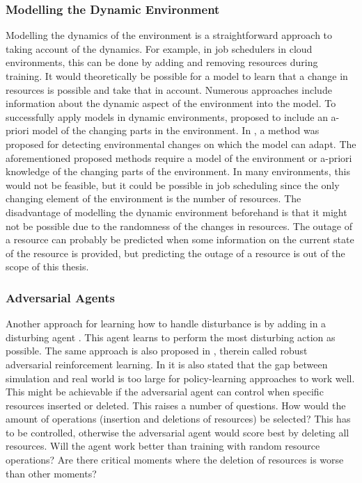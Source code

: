 \subsubsection{Modelling the Dynamic Environment}\label{sec:model}

Modelling the dynamics of the environment is a straightforward approach to
taking account of the dynamics. For example, in job schedulers in cloud
environments, this can be done by adding and removing resources during
training. It would theoretically be possible for a model to learn that a
change in resources is possible and take that in account. Numerous approaches
include information about the dynamic aspect of the environment into the
model. To successfully apply \rl models in dynamic environments,
 proposed to include an a-priori model of the changing
parts in the environment. In , a method was proposed for
detecting environmental changes on which the model can adapt. The
aforementioned proposed methods require a model of the environment or a-priori
knowledge of the changing parts of the environment. In many environments, this
would not be feasible, but it could be possible in job scheduling since the
only changing element of the environment is the number of resources. The
disadvantage of modelling the dynamic environment beforehand is that it might
not be possible due to the randomness of the changes in resources. The outage
of a resource can probably be predicted when some information on the current
state of the resource is provided, but predicting the outage of a resource is
out of the scope of this thesis.


\subsubsection{Adversarial Agents}\label{sec:adversarial}

Another approach for learning how to handle disturbance is by adding in a
disturbing agent \cite{morimoto2005}. This agent learns to perform the most
disturbing action as possible. The same approach is also proposed in
, therein called robust adversarial reinforcement learning.
In  it is also stated that the gap between simulation and
real world is too large for policy-learning approaches to work well. This
might be achievable if the adversarial agent can control when specific
resources inserted or deleted. This raises a number of questions. How would
the amount of operations (insertion and deletions of resources) be selected?
This has to be controlled, otherwise the adversarial agent would score best by
deleting all resources. Will the agent work better than training with random
resource operations? Are there critical moments where the deletion of
resources is worse than other moments?

